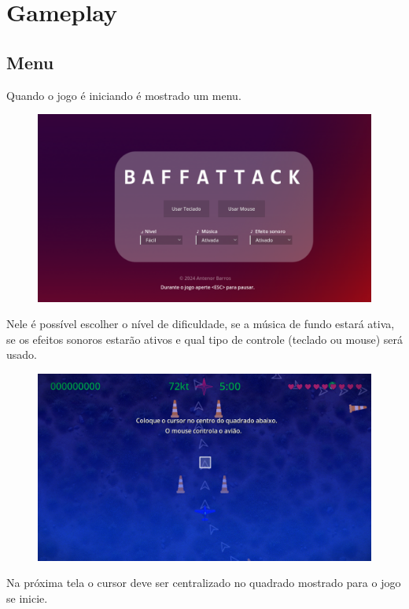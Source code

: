 \chapter{Gameplay}

\section{Menu}
Quando o jogo é iniciando é mostrado um menu.

\begin{figure}[h]
    \centering
    \includegraphics[width=\textwidth]{menu.png}
\end{figure}

Nele é possível escolher o nível de dificuldade, se a música de fundo estará ativa, se os efeitos sonoros estarão ativos e 
qual tipo de controle (teclado ou mouse) será usado.


\begin{figure}[h]
    \centering
    \includegraphics[width=\textwidth]{center.png}
\end{figure}

Na próxima tela o cursor deve ser centralizado no quadrado mostrado para o jogo se inicie.

